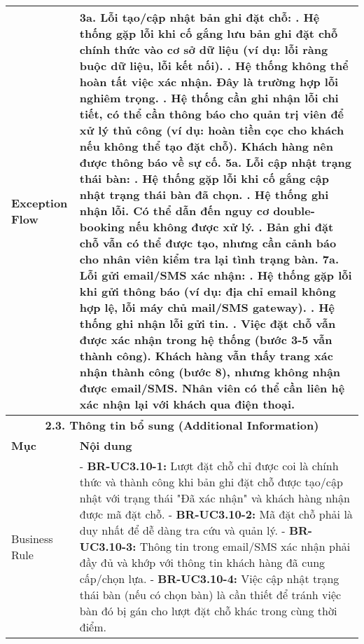 \begin{longtable}{|m{4cm}|p{11cm}|}
\hline
Exception Flow & \textbf{3a. Lỗi tạo/cập nhật bản ghi đặt chỗ:} \newline    1. Hệ thống gặp lỗi khi cố gắng lưu bản ghi đặt chỗ chính thức vào cơ sở dữ liệu (ví dụ: lỗi ràng buộc dữ liệu, lỗi kết nối). \newline    2. Hệ thống không thể hoàn tất việc xác nhận. Đây là trường hợp lỗi nghiêm trọng. \newline    3. Hệ thống cần ghi nhận lỗi chi tiết, có thể cần thông báo cho quản trị viên để xử lý thủ công (ví dụ: hoàn tiền cọc cho khách nếu không thể tạo đặt chỗ). Khách hàng nên được thông báo về sự cố. \newline \textbf{5a. Lỗi cập nhật trạng thái bàn:} \newline    1. Hệ thống gặp lỗi khi cố gắng cập nhật trạng thái bàn đã chọn. \newline    2. Hệ thống ghi nhận lỗi. Có thể dẫn đến nguy cơ double-booking nếu không được xử lý. \newline 3. Bản ghi đặt chỗ vẫn có thể được tạo, nhưng cần cảnh báo cho nhân viên kiểm tra lại tình trạng bàn. \newline \textbf{7a. Lỗi gửi email/SMS xác nhận:} \newline    1. Hệ thống gặp lỗi khi gửi thông báo (ví dụ: địa chỉ email không hợp lệ, lỗi máy chủ mail/SMS gateway). \newline    2. Hệ thống ghi nhận lỗi gửi tin. \newline    3. Việc đặt chỗ vẫn được xác nhận trong hệ thống (bước 3-5 vẫn thành công). Khách hàng vẫn thấy trang xác nhận thành công (bước 8), nhưng không nhận được email/SMS. Nhân viên có thể cần liên hệ xác nhận lại với khách qua điện thoại. \\
\hline
\multicolumn{2}{|c|}{\textbf{2.3. Thông tin bổ sung (Additional Information)}} \\
\hline
\textbf{Mục} & \textbf{Nội dung} \\
\hline
Business Rule & - \textbf{BR-UC3.10-1:} Lượt đặt chỗ chỉ được coi là chính thức và thành công khi bản ghi đặt chỗ được tạo/cập nhật với trạng thái "Đã xác nhận" và khách hàng nhận được mã đặt chỗ. \newline - \textbf{BR-UC3.10-2:} Mã đặt chỗ phải là duy nhất để dễ dàng tra cứu và quản lý. \newline - \textbf{BR-UC3.10-3:} Thông tin trong email/SMS xác nhận phải đầy đủ và khớp với thông tin khách hàng đã cung cấp/chọn lựa. \newline - \textbf{BR-UC3.10-4:} Việc cập nhật trạng thái bàn (nếu có chọn bàn) là cần thiết để tránh việc bàn đó bị gán cho lượt đặt chỗ khác trong cùng thời điểm. \\

\end{longtable}
